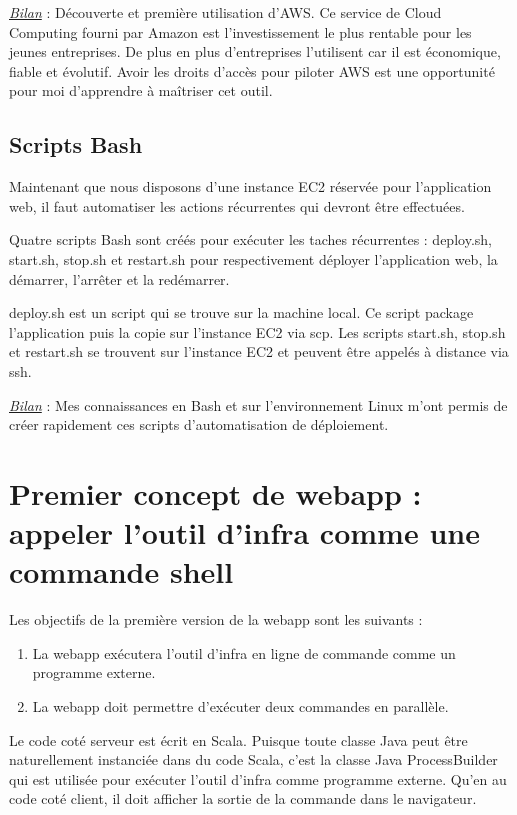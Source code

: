 \underline{\textit{Bilan}} : Découverte et première utilisation d'AWS. Ce
service de Cloud Computing fourni par Amazon est l'investissement le plus
rentable pour les jeunes entreprises. De plus en plus d'entreprises l'utilisent
car il est économique, fiable et évolutif. Avoir les droits d'accès pour piloter
AWS est une opportunité pour moi d'apprendre à maîtriser cet outil.

\subsection{Scripts Bash}

Maintenant que nous disposons d'une instance EC2 réservée pour l'application
web, il faut automatiser les actions récurrentes qui devront être effectuées.

Quatre scripts Bash sont créés pour exécuter les taches récurrentes :
deploy.sh, start.sh, stop.sh et restart.sh pour respectivement déployer
l'application web, la démarrer, l'arrêter et la redémarrer.

deploy.sh est un script qui se trouve sur la machine local.
Ce script package l'application puis la copie sur l'instance EC2 via scp.
Les scripts start.sh, stop.sh et restart.sh se trouvent sur l'instance EC2 et
peuvent être appelés à distance via ssh.

\underline{\textit{Bilan}} : Mes connaissances en Bash et sur l'environnement
Linux m'ont permis de créer rapidement ces scripts d'automatisation de
déploiement.

\section{Premier concept de webapp : appeler l'outil d'infra comme une commande
  shell}
\noindent Les objectifs de la première version de la webapp sont les suivants :
\begin{enumerate}
\item La webapp exécutera l'outil d'infra en ligne de commande comme un
  programme externe.
\item La webapp doit permettre d'exécuter deux commandes en parallèle.
\end{enumerate}

Le code coté serveur est écrit en Scala.
Puisque toute classe Java peut être naturellement instanciée dans du code Scala,
c'est la classe Java ProcessBuilder qui est utilisée pour exécuter
l'outil d'infra comme programme externe.
Qu'en au code coté client, il doit afficher la sortie de la commande dans le
navigateur.

